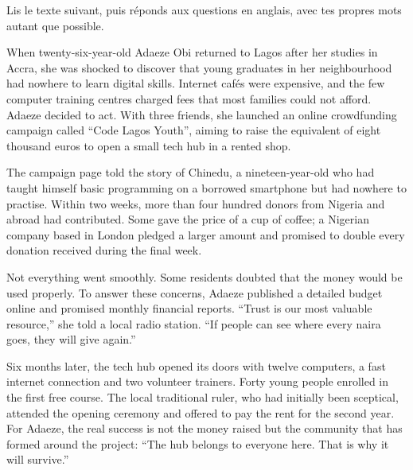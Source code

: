 \documentclass[11pt]{article}
\begin{document}
\begin{exercice}
Lis le texte suivant, puis réponds aux questions en anglais, avec tes propres mots autant que possible.

\begin{textebox}
When twenty-six-year-old Adaeze Obi returned to Lagos after her studies in Accra, she was shocked to discover that young graduates in her neighbourhood had nowhere to learn digital skills. Internet cafés were expensive, and the few computer training centres charged fees that most families could not afford. Adaeze decided to act. With three friends, she launched an online crowdfunding campaign called “Code Lagos Youth”, aiming to raise the equivalent of eight thousand euros to open a small tech hub in a rented shop.

The campaign page told the story of Chinedu, a nineteen-year-old who had taught himself basic programming on a borrowed smartphone but had nowhere to practise. Within two weeks, more than four hundred donors from Nigeria and abroad had contributed. Some gave the price of a cup of coffee; a Nigerian company based in London pledged a larger amount and promised to double every donation received during the final week.

Not everything went smoothly. Some residents doubted that the money would be used properly. To answer these concerns, Adaeze published a detailed budget online and promised monthly financial reports. “Trust is our most valuable resource,” she told a local radio station. “If people can see where every naira goes, they will give again.”

Six months later, the tech hub opened its doors with twelve computers, a fast internet connection and two volunteer trainers. Forty young people enrolled in the first free course. The local traditional ruler, who had initially been sceptical, attended the opening ceremony and offered to pay the rent for the second year. For Adaeze, the real success is not the money raised but the community that has formed around the project: “The hub belongs to everyone here. That is why it will survive.”
\end{textebox}


\end{exercice}
\end{document}
